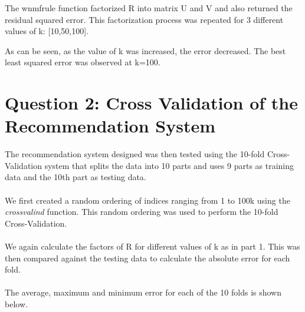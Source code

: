 \documentclass[12pt, onecolumn]{IEEEtran}
\begin{document}
The wnmfrule function factorized R into matrix U and V and also returned the residual squared error. This factorization process was repeated for 3 different values of k: [10,50,100].\\

\begin{table}[h!]
\centering
{}
\end{table}

As can be seen, as the value of k was increased, the error decreased. The best least squared error was observed at k=100.

\section*{Question 2: Cross Validation of the Recommendation System}
The recommendation system designed was then tested using the 10-fold Cross-Validation system that splits the data into 10 parts and uses 9 parts as training data and the 10th part as testing data.\\
\\
We first created a random ordering of indices ranging from 1 to 100k using the \emph{crossvalind} function. This random ordering was used to perform the 10-fold Cross-Validation.\\
\\
We again calculate the factors of R for different values of k as in part 1. This was then compared against the testing data to calculate the absolute error for each fold.\\
\\
The average, maximum and minimum error for each of the 10 folds is shown below.\\
\begin{table}[h!]
\centering
{}
\end{table}
\end{document}
